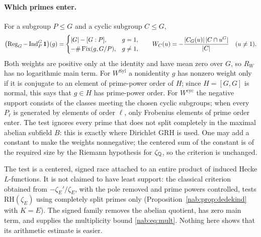 \paragraph{Which primes enter.}
For a subgroup $P\le G$ and a cyclic subgroup $C\le G$,
\begin{equation}\label{nab:eq:weights}
 \bigl(\operatorname{Reg}_G-\operatorname{Ind}_P^G\mathbf{1}\bigr)(g)=
 \begin{cases}\lvert G\rvert-[G:P],&g=1,\\ -\#\operatorname{Fix}(g,G/P),&g\ne1,\end{cases}
 \qquad
 W_C(u)=-\frac{\lvert C_G(u)\rvert\,\lvert C\cap u^G\rvert}{\lvert C\rvert}\quad(u\ne1).
\end{equation}
Both weights are positive only at the identity and have mean zero over $G$, so $R_W$ has
no logarithmic main term. For $W^{\mathrm{Syl}}$ a nonidentity $g$ has nonzero weight only
if it is conjugate to an element of prime-power order of $H$; since $H=[G,G]$ is normal,
this says that $g\in H$ has prime-power order. For $W^{\mathrm{cyc}}$ the negative support
consists of the classes meeting the chosen cyclic subgroups; when every $P_\ell$ is
generated by elements of order $\ell$, only Frobenius elements of prime order enter. The
test ignores every prime that does not split completely in the maximal abelian subfield
$B$: this is exactly where Dirichlet GRH is used. One may add a constant to make the
weights nonnegative; the centered sum of the constant is of the required size by the
Riemann hypothesis for $\zeta_{\mathbb{Q}}$, so the criterion is unchanged.

\begin{remark}\label{nab:rem:scope}
The test is a centered, signed race attached to an entire product of induced Hecke
$L$-functions. It is not claimed to have least support: the classical criterion obtained
from $-\zeta_E'/\zeta_E$, with the pole removed and prime powers controlled, tests
$\mathrm{RH}(\zeta_E)$ using completely split primes only
(Proposition~\ref{nab:prop:dedekind} with $K=E$). The signed family removes the abelian quotient, has
zero main term, and supplies the multiplicity bound \eqref{nab:eq:mult}. Nothing here
shows that its arithmetic estimate is easier.
\end{remark}

